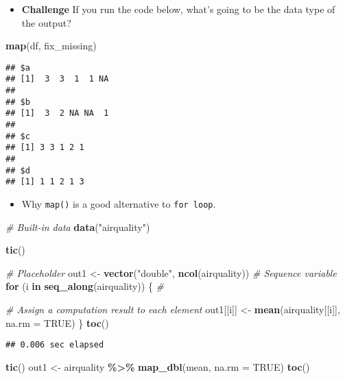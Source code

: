 \documentclass[
]{book}
\newenvironment{Shaded}{\begin{snugshade}}{\end{snugshade}}
\newcommand{\CommentTok}[1]{\textcolor[rgb]{0.56,0.35,0.01}{\textit{#1}}}
\newcommand{\ControlFlowTok}[1]{\textcolor[rgb]{0.13,0.29,0.53}{\textbf{#1}}}
\newcommand{\DataTypeTok}[1]{\textcolor[rgb]{0.13,0.29,0.53}{#1}}
\newcommand{\KeywordTok}[1]{\textcolor[rgb]{0.13,0.29,0.53}{\textbf{#1}}}
\newcommand{\NormalTok}[1]{#1}
\newcommand{\OperatorTok}[1]{\textcolor[rgb]{0.81,0.36,0.00}{\textbf{#1}}}
\newcommand{\OtherTok}[1]{\textcolor[rgb]{0.56,0.35,0.01}{#1}}
\newcommand{\StringTok}[1]{\textcolor[rgb]{0.31,0.60,0.02}{#1}}
\providecommand{\tightlist}{%
  \setlength{\itemsep}{0pt}\setlength{\parskip}{0pt}}
\begin{document}
\begin{itemize}
\tightlist
\item
  \textbf{Challenge} If you run the code below, what's going to be the data type of the output?
\end{itemize}

\begin{Shaded}
\begin{Highlighting}[]
\KeywordTok{map}\NormalTok{(df, fix\_missing)}
\end{Highlighting}
\end{Shaded}

\begin{verbatim}
## $a
## [1]  3  3  1  1 NA
## 
## $b
## [1]  3  2 NA NA  1
## 
## $c
## [1] 3 3 1 2 1
## 
## $d
## [1] 1 1 2 1 3
\end{verbatim}

\begin{itemize}
\tightlist
\item
  Why \texttt{map()} is a good alternative to \texttt{for\ loop}.
\end{itemize}

\begin{Shaded}
\begin{Highlighting}[]
\CommentTok{\# Built{-}in data}
\KeywordTok{data}\NormalTok{(}\StringTok{"airquality"}\NormalTok{)}

\KeywordTok{tic}\NormalTok{()}

\CommentTok{\# Placeholder}
\NormalTok{out1 \textless{}{-}}\StringTok{ }\KeywordTok{vector}\NormalTok{(}\StringTok{"double"}\NormalTok{, }\KeywordTok{ncol}\NormalTok{(airquality))}
\CommentTok{\# Sequence variable}
\ControlFlowTok{for}\NormalTok{ (i }\ControlFlowTok{in} \KeywordTok{seq\_along}\NormalTok{(airquality)) \{ }\CommentTok{\#}

  \CommentTok{\# Assign a computation result to each element}
\NormalTok{  out1[[i]] \textless{}{-}}\StringTok{ }\KeywordTok{mean}\NormalTok{(airquality[[i]], }\DataTypeTok{na.rm =} \OtherTok{TRUE}\NormalTok{)}
\NormalTok{\}}
\KeywordTok{toc}\NormalTok{()}
\end{Highlighting}
\end{Shaded}

\begin{verbatim}
## 0.006 sec elapsed
\end{verbatim}

\begin{Shaded}
\begin{Highlighting}[]
\KeywordTok{tic}\NormalTok{()}
\NormalTok{out1 \textless{}{-}}\StringTok{ }\NormalTok{airquality }\OperatorTok{\%\textgreater{}\%}\StringTok{ }\KeywordTok{map\_dbl}\NormalTok{(mean, }\DataTypeTok{na.rm =} \OtherTok{TRUE}\NormalTok{)}
\KeywordTok{toc}\NormalTok{()}
\end{Highlighting}
\end{Shaded}
\end{document}
